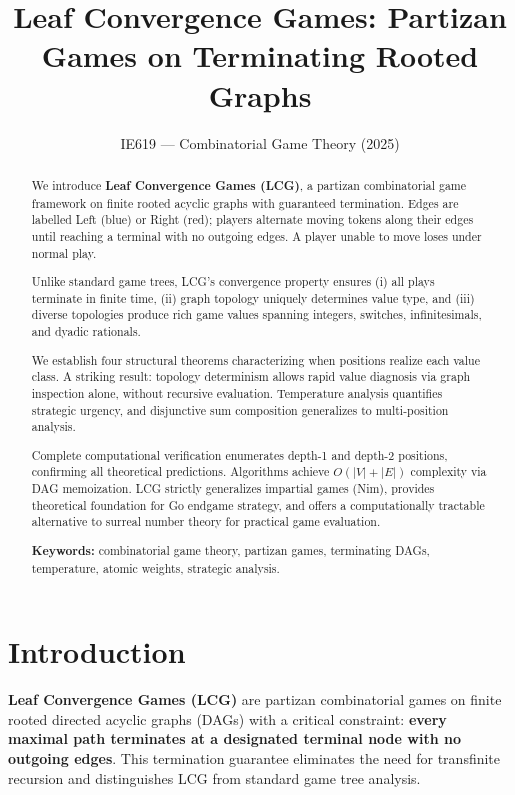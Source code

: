 \documentclass[10pt,a4paper,twocolumn]{article}
\title{Leaf Convergence Games: Partizan Games on Terminating Rooted Graphs}
\author{IE619 --- Combinatorial Game Theory (2025)}
\date{}
\theoremstyle{plain}
\theoremstyle{definition}
\theoremstyle{remark}
\begin{document}
\maketitle

\begin{abstract}
We introduce \textbf{Leaf Convergence Games (LCG)}, a partizan combinatorial game framework on finite rooted acyclic graphs with guaranteed termination. Edges are labelled Left (blue) or Right (red); players alternate moving tokens along their edges until reaching a terminal with no outgoing edges. A player unable to move loses under normal play.

Unlike standard game trees, LCG's convergence property ensures (i) all plays terminate in finite time, (ii) graph topology uniquely determines value type, and (iii) diverse topologies produce rich game values spanning integers, switches, infinitesimals, and dyadic rationals.

We establish four structural theorems characterizing when positions realize each value class. A striking result: topology determinism allows rapid value diagnosis via graph inspection alone, without recursive evaluation. Temperature analysis quantifies strategic urgency, and disjunctive sum composition generalizes to multi-position analysis.

Complete computational verification enumerates depth-1 and depth-2 positions, confirming all theoretical predictions. Algorithms achieve $O(|V|+|E|)$ complexity via DAG memoization. LCG strictly generalizes impartial games (Nim), provides theoretical foundation for Go endgame strategy, and offers a computationally tractable alternative to surreal number theory for practical game evaluation.

\textbf{Keywords:} combinatorial game theory, partizan games, terminating DAGs, temperature, atomic weights, strategic analysis.
\end{abstract}

\section{Introduction}

\textbf{Leaf Convergence Games (LCG)} are partizan combinatorial games on finite rooted directed acyclic graphs (DAGs) with a critical constraint: \textbf{every maximal path terminates at a designated terminal node with no outgoing edges}. This termination guarantee eliminates the need for transfinite recursion and distinguishes LCG from standard game tree analysis.
\end{document}
